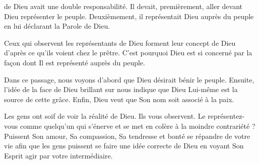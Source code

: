 \dvrule






 de Dieu avait une double responsabilité.
 Il devait, premièrement, aller devant Dieu représenter le peuple.
 Deuxièmement, il représentait Dieu auprès du peuple
 en lui déclarant la Parole de Dieu. 


Ceux qui observent les représentants de Dieu forment leur concept de Dieu
 d'après ce qu'ils voient chez le prêtre.
 C'est pourquoi Dieu est si concerné par la façon dont Il est représenté
 auprès du peuple. 

Dans ce passage, nous voyons d'abord que Dieu désirait bénir le peuple.
 Ensuite, l'idée de la face de Dieu brillant sur nous indique
 que Dieu Lui-même est la source de cette grâce.
 Enfin, Dieu veut que Son nom soit associé à la paix. 

Les gens ont soif de voir la réalité de Dieu. Ils vous observent.
 Le représentez-vous comme quelqu'un qui s'énerve et se met en colère
 à la moindre contrariété ? Puissent Son amour, Sa compassion,
 Sa tendresse et bonté se répandre de votre vie afin que les gens
 puissent se faire une idée correcte de Dieu en voyant
 Son Esprit agir par votre intermédiaire. 

\dvrule




